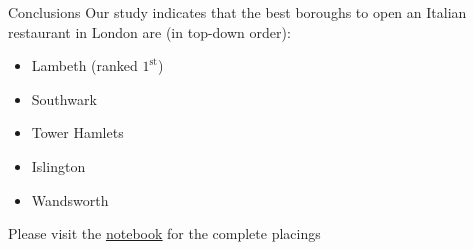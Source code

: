 \documentclass{beamer}
\begin{document}
\begin{frame}{Conclusions}
Our study indicates that the best boroughs to open an Italian restaurant in London are (in top-down order):

\begin{itemize}
\item Lambeth (ranked $1^\text{st}$)
\item Southwark
\item Tower Hamlets
\item Islington
\item Wandsworth
\end{itemize}

Please visit the \href{https://github.com/biancovic/Coursera_Capstone/blob/master/BattleOfNeighbourhoods/BattleOfNeighbourhoods.ipynb}{\underline{notebook}} for the complete placings

\end{frame}
\end{document}
